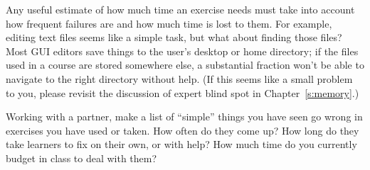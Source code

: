 Any useful estimate of how much time an exercise needs must take into
account how frequent failures are and how much time is lost to them. For
example, editing text files seems like a simple task, but what about
finding those files? Most GUI editors save things to the user's desktop
or home directory; if the files used in a course are stored somewhere
else, a substantial fraction won't be able to navigate to the right
directory without help. (If this seems like a small problem to you,
please revisit the discussion of expert blind spot in
Chapter~\ref{s:memory}.)

Working with a partner, make a list of ``simple'' things you have seen go
wrong in exercises you have used or taken. How often do they come up?
How long do they take learners to fix on their own, or with help? How
much time do you currently budget in class to deal with them?
